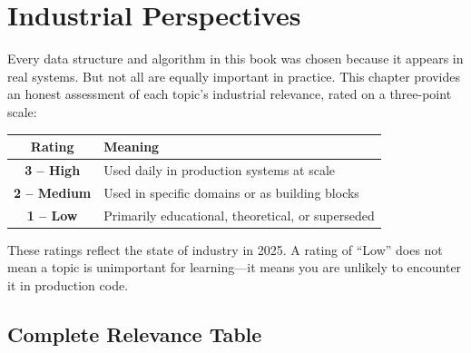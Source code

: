\chapter{Industrial Perspectives}
\label{ch:industrial-perspectives}

Every data structure and algorithm in this book was chosen because it appears in real systems. But not all are equally important in practice. This chapter provides an honest assessment of each topic's industrial relevance, rated on a three-point scale:

\begin{center}
\begin{tabular}{cl}
\toprule
Rating & Meaning \\
\midrule
\textbf{3 -- High} & Used daily in production systems at scale \\
\textbf{2 -- Medium} & Used in specific domains or as building blocks \\
\textbf{1 -- Low} & Primarily educational, theoretical, or superseded \\
\bottomrule
\end{tabular}
\end{center}

These ratings reflect the state of industry in 2025. A rating of ``Low'' does not mean a topic is unimportant for learning---it means you are unlikely to encounter it in production code.


\section{Complete Relevance Table}

